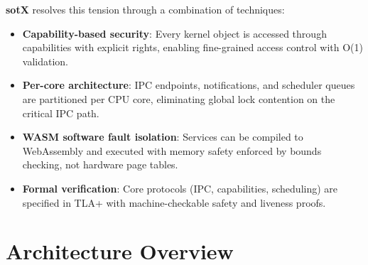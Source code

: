 \documentclass[11pt,letterpaper]{article}
\theoremstyle{definition}
\begin{document}
\textbf{sotX} resolves this tension through a combination of techniques:
\begin{itemize}[nosep]
    \item \textbf{Capability-based security}: Every kernel object is accessed
          through capabilities with explicit rights, enabling fine-grained
          access control with O(1) validation.
    \item \textbf{Per-core architecture}: IPC endpoints, notifications, and
          scheduler queues are partitioned per CPU core, eliminating global
          lock contention on the critical IPC path.
    \item \textbf{WASM software fault isolation}: Services can be compiled to
          WebAssembly and executed with memory safety enforced by bounds
          checking, not hardware page tables.
    \item \textbf{Formal verification}: Core protocols (IPC, capabilities,
          scheduling) are specified in TLA+ with machine-checkable safety and
          liveness proofs.
\end{itemize}

\section{Architecture Overview}
\end{document}

